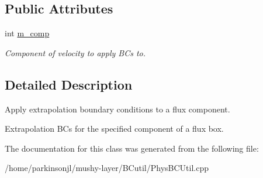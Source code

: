 \subsection*{Public Attributes}
\begin{DoxyCompactItemize}
\item 
\mbox{\label{class_basic_flux_extrap_b_c_function_ad57cef41aad080d3997f5ecebd2936e1}} 
int \hyperlink{class_basic_flux_extrap_b_c_function_ad57cef41aad080d3997f5ecebd2936e1}{m\+\_\+comp}
\begin{DoxyCompactList}\small\item\em Component of velocity to apply B\+Cs to. \end{DoxyCompactList}\end{DoxyCompactItemize}


\subsection{Detailed Description}
Apply extrapolation boundary conditions to a flux component. 

Extrapolation B\+Cs for the specified component of a flux box. 

The documentation for this class was generated from the following file\+:\begin{DoxyCompactItemize}
\item 
/home/parkinsonjl/mushy-\/layer/\+B\+Cutil/Phys\+B\+C\+Util.\+cpp\end{DoxyCompactItemize}
